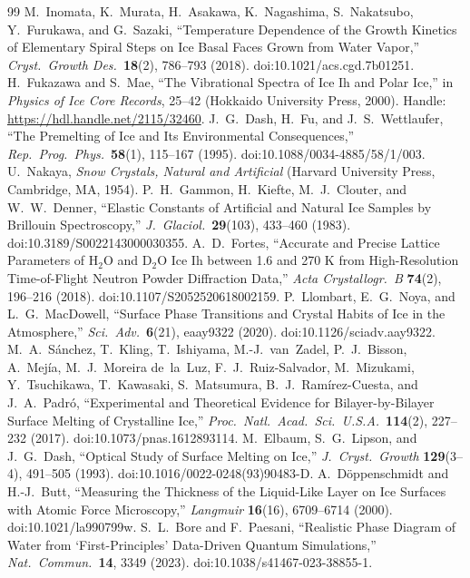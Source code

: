 \documentclass[12pt,letterpaper]{article}
\begin{document}
\begin{thebibliography}{99}
 M.~Inomata, K.~Murata, H.~Asakawa, K.~Nagashima, S.~Nakatsubo, Y.~Furukawa, and G.~Sazaki, ``Temperature Dependence of the Growth Kinetics of Elementary Spiral Steps on Ice Basal Faces Grown from Water Vapor,'' \emph{Cryst.\ Growth Des.}\ \textbf{18}(2), 786--793 (2018). doi:10.1021/acs.cgd.7b01251.
 H.~Fukazawa and S.~Mae, ``The Vibrational Spectra of Ice Ih and Polar Ice,'' in \emph{Physics of Ice Core Records}, 25--42 (Hokkaido University Press, 2000). Handle: \url{https://hdl.handle.net/2115/32460}.
 J.~G.~Dash, H.~Fu, and J.~S.~Wettlaufer, ``The Premelting of Ice and Its Environmental Consequences,'' \emph{Rep.\ Prog.\ Phys.}\ \textbf{58}(1), 115--167 (1995). doi:10.1088/0034-4885/58/1/003.
 U.~Nakaya, \emph{Snow Crystals, Natural and Artificial} (Harvard University Press, Cambridge, MA, 1954).
 P.~H.~Gammon, H.~Kiefte, M.~J.~Clouter, and W.~W.~Denner, ``Elastic Constants of Artificial and Natural Ice Samples by Brillouin Spectroscopy,'' \emph{J.\ Glaciol.}\ \textbf{29}(103), 433--460 (1983). doi:10.3189/S0022143000030355.
 A.~D.~Fortes, ``Accurate and Precise Lattice Parameters of H$_2$O and D$_2$O Ice Ih between 1.6 and 270 K from High-Resolution Time-of-Flight Neutron Powder Diffraction Data,'' \emph{Acta Crystallogr.\ B} \textbf{74}(2), 196--216 (2018). doi:10.1107/S2052520618002159.
 P.~Llombart, E.~G.~Noya, and L.~G.~MacDowell, ``Surface Phase Transitions and Crystal Habits of Ice in the Atmosphere,'' \emph{Sci.\ Adv.}\ \textbf{6}(21), eaay9322 (2020). doi:10.1126/sciadv.aay9322.
 M.~A.~S\'anchez, T.~Kling, T.~Ishiyama, M.-J.~van~Zadel, P.~J.~Bisson, A.~Mej\'ia, M.~J.~Moreira de~la~Luz, F.~J.~Ruiz-Salvador, M.~Mizukami, Y.~Tsuchikawa, T.~Kawasaki, S.~Matsumura, B.~J.~Ram\'irez-Cuesta, and J.~A.~Padr\'o, ``Experimental and Theoretical Evidence for Bilayer-by-Bilayer Surface Melting of Crystalline Ice,'' \emph{Proc.\ Natl.\ Acad.\ Sci.\ U.S.A.}\ \textbf{114}(2), 227--232 (2017). doi:10.1073/pnas.1612893114.
 M.~Elbaum, S.~G.~Lipson, and J.~G.~Dash, ``Optical Study of Surface Melting on Ice,'' \emph{J.\ Cryst.\ Growth} \textbf{129}(3--4), 491--505 (1993). doi:10.1016/0022-0248(93)90483-D.
 A.~D\"oppenschmidt and H.-J.~Butt, ``Measuring the Thickness of the Liquid-Like Layer on Ice Surfaces with Atomic Force Microscopy,'' \emph{Langmuir} \textbf{16}(16), 6709--6714 (2000). doi:10.1021/la990799w.
 S.~L.~Bore and F.~Paesani, ``Realistic Phase Diagram of Water from `First-Principles' Data-Driven Quantum Simulations,'' \emph{Nat.\ Commun.}\ \textbf{14}, 3349 (2023). doi:10.1038/s41467-023-38855-1.

\end{thebibliography}
\end{document}
